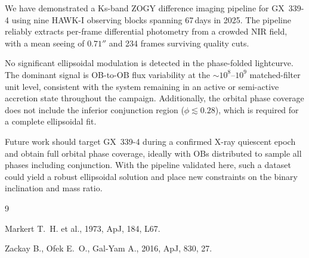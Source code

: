 \documentclass[12pt,a4paper]{article}
\begin{document}
We have demonstrated a Ks-band ZOGY difference imaging pipeline for
GX~339-4 using nine HAWK-I observing blocks spanning 67\,days in
2025.  The pipeline reliably extracts per-frame differential
photometry from a crowded NIR field, with a mean seeing of
$0.71''$ and 234 frames surviving quality cuts.

No significant ellipsoidal modulation is detected in the
phase-folded lightcurve.  The dominant signal is OB-to-OB flux
variability at the $\sim 10^8$--$10^9$ matched-filter unit level,
consistent with the system remaining in an active or semi-active
accretion state throughout the campaign.  Additionally, the orbital
phase coverage does not include the inferior conjunction region
($\phi \lesssim 0.28$), which is required for a complete ellipsoidal
fit.

Future work should target GX~339-4 during a confirmed X-ray
quiescent epoch and obtain full orbital phase coverage, ideally
with OBs distributed to sample all phases including conjunction.
With the pipeline validated here, such a dataset could yield a
robust ellipsoidal solution and place new constraints on the binary
inclination and mass ratio.

\begin{thebibliography}{9}

  Markert T.~H. et al., 1973, ApJ, 184, L67.

  Zackay B., Ofek E.~O., Gal-Yam A., 2016, ApJ, 830, 27.

\end{thebibliography}
\end{document}
